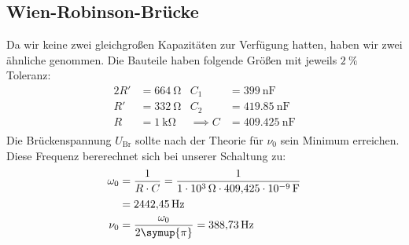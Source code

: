 \subsection{Wien-Robinson-Brücke}
Da wir keine zwei gleichgroßen Kapazitäten zur Verfügung hatten, haben wir zwei ähnliche genommen.
Die Bauteile haben folgende Größen mit jeweils $\SI{2}{\percent}$ Toleranz:
\begin{align*}
  2R' &= \SI{664}{\ohm} & C_1 &= \SI{399}{\nano\farad}\\
  R' &= \SI{332}{\ohm} & C_2 &= \SI{419.85}{\nano\farad}\\
  R &= \SI{1}{\kilo\ohm} & \implies C &= \SI{409.425}{\nano\farad}\\
\end{align*}
Die Brückenspannung $U_{\text{Br}}$ sollte nach der Theorie für $\nu_0$ sein Minimum erreichen.
Diese Frequenz bererechnet sich bei unserer Schaltung zu:
\begin{align*}
  \omega_0 &= \frac{1}{R\cdot C} = \frac{1}{\SI{1e3}{\ohm} \cdot \SI{409.425e-9}{\farad}} \\
 &= \SI{2442.45}{\hertz}\\
 \nu_0 &= \frac{\omega_0}{2\symup{\pi}} = \SI{388.73}{\hertz}
\end{align*}

